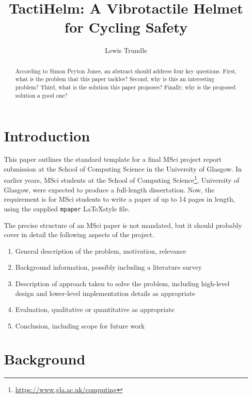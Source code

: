 \documentclass{mpaper}
\begin{document}
\title{TactiHelm: A Vibrotactile Helmet for Cycling Safety}
\author{Lewis Trundle}

\maketitle

\begin{abstract}
According to Simon Peyton Jones, an abstract should address
four key questions. First, what is the problem that this
paper tackles? Second, why is this an interesting problem?
Third, what is the solution this paper proposes?
Finally, why is the proposed solution a good one?
\end{abstract}

\section{Introduction}

This paper outlines the standard template for a final MSci
project report submission at the School of Computing Science
in the University of Glasgow.
In earlier years, MSci students at the School of Computing
Science\footnote{\url{https://www.gla.ac.uk/computing}},
University of Glasgow, were expected to produce a full-length
dissertation. Now, the requirement is for MSci students to
write a paper of up to 14 pages in length, using the supplied
\texttt{mpaper} \LaTeX style file.

The precise structure of an MSci paper is not mandated, but it should
probably cover in detail the following aspects of the project.
\begin{enumerate}
\item General description of the problem, motivation, relevance
\item Background information, possibly including a literature survey
\item Description of approach taken to solve the problem, including
  high-level design and lower-level implementation details as appropriate
\item Evaluation, qualitative or quantitative as appropriate
\item Conclusion, including scope for future work
\end{enumerate}

\section{Background}
\end{document}
